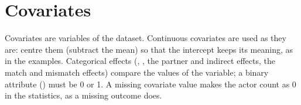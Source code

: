 \section{Covariates}\label{sec:covariates}

Covariates are variables of the dataset. Continuous covariates are used as they are: centre them (subtract the mean) so that the intercept keeps its meaning, as in the examples. Categorical effects (, , the partner and indirect effects, the match and mismatch effects) compare the values of the variable; a binary attribute () must be 0 or 1. A missing covariate value makes the actor count as 0 in the statistics, as a missing outcome does.

